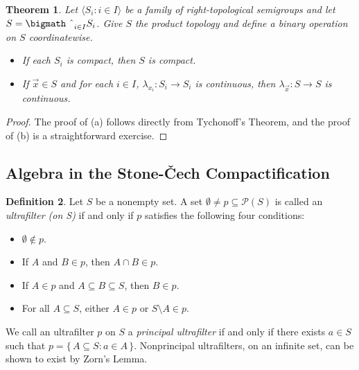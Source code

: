 \documentclass[12pt]{article}
\theoremstyle{plain}
\newtheorem{thm}{Theorem}[section]
\theoremstyle{definition}
\newtheorem{defn}[thm]{Definition}
\newcommand{\la}{\langle}
\newcommand{\ra}{\rangle}
\newcommand{\calP}{\mathcal{P}}
\newcommand{\bigtimes}{\hbox{\bigmath \char'2}}
\begin{document}
\begin{thm}
  Let $\la S_i : i \in I \ra$ be a family of right-topological
  semigroups and let $S = \bigtimes_{i \in I} S_i$.
  Give $S$ the product topology and define a binary operation on $S$
  coordinatewise. 
  \begin{itemize}
    \item[(a)] If each $S_i$ is compact, then $S$ is compact.

    \item[(b)] If $\vec{x} \in S$ and for each $i \in I$,
      $\lambda_{x_i} \colon S_i \to S_i$ is continuous, then
      $\lambda_{\vec{x}} \colon S \to S$ is continuous.
  \end{itemize}
\end{thm}
\begin{proof}
  The proof of (a) follows directly from Tychonoff's Theorem,
  and the proof of (b) is a straightforward exercise.
\end{proof}

\subsection{Algebra in the Stone-\v{C}ech Compactification}
\begin{defn}
  Let $S$ be a nonempty set.
  A set $\emptyset \ne p \subseteq \calP(S)$ is called an
  \textsl{ultrafilter (on S)} if and only if $p$ satisfies the
  following four conditions:
  \begin{itemize}
    \item[(1)] $\emptyset \not\in p$.
    \item[(2)] If $A$ and $B \in p$, then $A \cap B \in p$.
    \item[(3)] If $A \in p$ and $A \subseteq B \subseteq S$, then $B
      \in p$.
    \item[(4)] For all $A \subseteq S$, either $A \in p$ or $S
      \setminus A \in p$. 
  \end{itemize}
\end{defn}
We call an ultrafilter $p$ on $S$ a \textsl{principal ultrafilter} if and
only if there exists $a \in S$ such that $p = \{\, A \subseteq S : a
\in A \,\}$.
Nonprincipal ultrafilters, on an infinite set, can be shown to exist
by Zorn's Lemma.%
\end{document}
